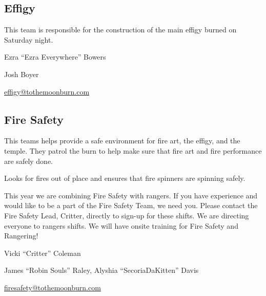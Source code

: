 \begin{multicols}{2}

\subsection*{Effigy}
This team is responsible for the construction of the main effigy burned on Saturday night.

\begin{description}[leftmargin=6em,noitemsep,style=nextline]
   \item[Lead:] Ezra ``Ezra Everywhere'' Bowers 
   \item[Co-leads:] Josh Boyer
   \item[Contact:] \url{effigy@tothemoonburn.com}
\end{description}


\subsection*{Fire Safety}
This teams helps provide a safe environment for fire art, the \gls{effigy}, and the \gls{temple}. They patrol the burn to help make sure that fire art and fire performance are safely done.

\begin{addmargin}[.3cm]{0cm}
\begin{description}[noitemsep]
	\item[Dirt Patrol:] Looks for fires out of place and ensures that fire spinners are spinning safely.
\end{description}
\end{addmargin}

This year we are combining Fire Safety with \gls{rangers}. If you have experience and would like to be a part of the Fire Safety Team, we need you. Please contact the Fire Safety Lead, Critter, directly to sign-up for these shifts. We are directing everyone to \gls{rangers} shifts. We will have onsite training for Fire Safety and Rangering!

\begin{description}[leftmargin=6em,noitemsep,style=nextline]
   \item[Lead:] Vicki ``Critter'' Coleman
   \item[Co-leads:] James ``Robin Souls'' Raley, Alyshia ``SecoriaDaKitten'' Davis
   \item[Contact:] \url{firesafety@tothemoonburn.com}
\end{description}


\end{multicols}
